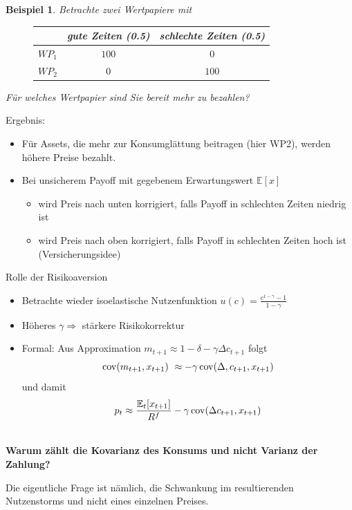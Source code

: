 \documentclass[12pt]{extreport} %
\theoremstyle{named}
\theoremstyle{nnamed}
\theoremstyle{itshape}
\theoremstyle{normal}
\newtheorem*{beispiel}{Beispiel}
\begin{document}
\begin{beispiel}
	Betrachte zwei Wertpapiere mit 
	
	\begin{figure}[h!] \centering
		\begin{tabular}{l|cc}
  			~  & gute Zeiten (0.5) & schlechte Zeiten (0.5) \\
  			\hline
 			$WP_1$ & $100$ & $0$ \\
  			$WP_2$ & $0$ & $100$
		\end{tabular}
	\end{figure} 


	Für welches Wertpapier sind Sie bereit mehr zu bezahlen?	
\end{beispiel}


Ergebnis:
\begin{itemize}
	\item Für Assets, die mehr zur Konsumglättung beitragen (hier WP2), werden höhere Preise bezahlt.
	\item Bei unsicherem Payoff mit gegebenem Erwartungswert $\mathbb{E}[x]$
		\begin{itemize}
			\item wird Preis nach unten korrigiert, falls Payoff in schlechten Zeiten niedrig ist
			\item wird Preis nach oben korrigiert, falls Payoff in schlechten Zeiten hoch ist (Versicherungsidee)
		\end{itemize}
\end{itemize}

Rolle der Risikoaversion
\begin{itemize}
	\item Betrachte wieder isoelastische Nutzenfunktion $u(c) = \frac{c^{1-\gamma} - 1}{1 - \gamma}$
	\item Höheres $\gamma \Rightarrow$ stärkere Risikokorrektur
	\item Formal: Aus Approximation $m_{t+1} \approx 1 - \delta - \gamma \Delta c_{t+1}$ folgt 
		$$ \cov(m_{t+1}, x_{t+1}) \approx - \gamma \cov(\Delta, c_{t+1}, x_{t+1}) $$
		und damit
		$$	p_t \approx \frac{\mathbb{E}_t[x_{t+1}]}{R^f} - \gamma \operatorname{cov}(\Delta c_{t+1}, x_{t+1}) $$
\end{itemize}
 ~\\
\textbf{Warum zählt die Kovarianz des Konsums und nicht Varianz der Zahlung?} \medskip

Die eigentliche Frage ist nämlich, die Schwankung im resultierenden Nutzenstorms und nicht eines einzelnen Preises.
\end{document}
